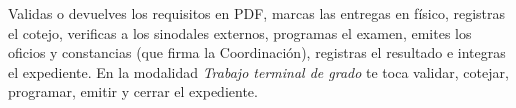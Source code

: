 \documentclass[11pt,a4paper]{article}
\begin{document}
{\small\tableofcontents}
\newpage
\begin{quevasahacer}
Validas o devuelves los requisitos en PDF, marcas las entregas en físico, registras el cotejo, verificas a los sinodales externos, programas el examen, emites los oficios y constancias (que firma la Coordinación), registras el resultado e integras el expediente. En la modalidad \emph{Trabajo terminal de grado} te toca validar, cotejar, programar, emitir y cerrar el expediente.
\end{quevasahacer}




\end{document}

